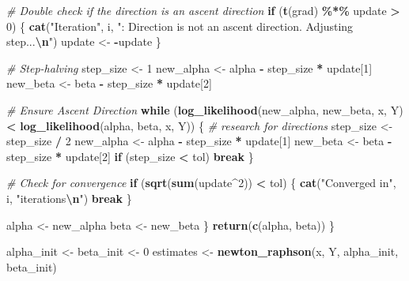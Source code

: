 \documentclass[
]{article}
\newenvironment{Shaded}{\begin{snugshade}}{\end{snugshade}}
\newcommand{\CommentTok}[1]{\textcolor[rgb]{0.56,0.35,0.01}{\textit{#1}}}
\newcommand{\ControlFlowTok}[1]{\textcolor[rgb]{0.13,0.29,0.53}{\textbf{#1}}}
\newcommand{\DecValTok}[1]{\textcolor[rgb]{0.00,0.00,0.81}{#1}}
\newcommand{\FunctionTok}[1]{\textcolor[rgb]{0.13,0.29,0.53}{\textbf{#1}}}
\newcommand{\NormalTok}[1]{#1}
\newcommand{\OtherTok}[1]{\textcolor[rgb]{0.56,0.35,0.01}{#1}}
\newcommand{\SpecialCharTok}[1]{\textcolor[rgb]{0.81,0.36,0.00}{\textbf{#1}}}
\newcommand{\StringTok}[1]{\textcolor[rgb]{0.31,0.60,0.02}{#1}}
\begin{document}
\begin{Shaded}
\begin{Highlighting}[]
     \CommentTok{\# Double check if the direction is an ascent direction}
    \ControlFlowTok{if}\NormalTok{ (}\FunctionTok{t}\NormalTok{(grad) }\SpecialCharTok{\%*\%}\NormalTok{ update }\SpecialCharTok{\textgreater{}} \DecValTok{0}\NormalTok{) \{}
      \FunctionTok{cat}\NormalTok{(}\StringTok{"Iteration"}\NormalTok{, i, }\StringTok{": Direction is not an ascent direction. Adjusting step...}\SpecialCharTok{\textbackslash{}n}\StringTok{"}\NormalTok{)}
\NormalTok{      update }\OtherTok{\textless{}{-}} \SpecialCharTok{{-}}\NormalTok{update}
\NormalTok{    \}}
    
    \CommentTok{\# Step{-}halving}
\NormalTok{    step\_size }\OtherTok{\textless{}{-}} \DecValTok{1}
\NormalTok{    new\_alpha }\OtherTok{\textless{}{-}}\NormalTok{ alpha }\SpecialCharTok{{-}}\NormalTok{ step\_size }\SpecialCharTok{*}\NormalTok{ update[}\DecValTok{1}\NormalTok{]}
\NormalTok{    new\_beta }\OtherTok{\textless{}{-}}\NormalTok{ beta }\SpecialCharTok{{-}}\NormalTok{ step\_size }\SpecialCharTok{*}\NormalTok{ update[}\DecValTok{2}\NormalTok{]}
    
    \CommentTok{\# Ensure Ascent Direction}
    \ControlFlowTok{while}\NormalTok{ (}\FunctionTok{log\_likelihood}\NormalTok{(new\_alpha, new\_beta, x, Y) }\SpecialCharTok{\textless{}} \FunctionTok{log\_likelihood}\NormalTok{(alpha, beta, x, Y)) \{ }
      \CommentTok{\# research for directions}
\NormalTok{      step\_size }\OtherTok{\textless{}{-}}\NormalTok{ step\_size }\SpecialCharTok{/} \DecValTok{2}
\NormalTok{      new\_alpha }\OtherTok{\textless{}{-}}\NormalTok{ alpha }\SpecialCharTok{{-}}\NormalTok{ step\_size }\SpecialCharTok{*}\NormalTok{ update[}\DecValTok{1}\NormalTok{]}
\NormalTok{      new\_beta }\OtherTok{\textless{}{-}}\NormalTok{ beta }\SpecialCharTok{{-}}\NormalTok{ step\_size }\SpecialCharTok{*}\NormalTok{ update[}\DecValTok{2}\NormalTok{]}
      \ControlFlowTok{if}\NormalTok{ (step\_size }\SpecialCharTok{\textless{}}\NormalTok{ tol) }\ControlFlowTok{break}
\NormalTok{    \}}
    
    \CommentTok{\# Check for convergence}
    \ControlFlowTok{if}\NormalTok{ (}\FunctionTok{sqrt}\NormalTok{(}\FunctionTok{sum}\NormalTok{(update}\SpecialCharTok{\^{}}\DecValTok{2}\NormalTok{)) }\SpecialCharTok{\textless{}}\NormalTok{ tol) \{}
      \FunctionTok{cat}\NormalTok{(}\StringTok{"Converged in"}\NormalTok{, i, }\StringTok{"iterations}\SpecialCharTok{\textbackslash{}n}\StringTok{"}\NormalTok{)}
      \ControlFlowTok{break}
\NormalTok{    \}}
    
\NormalTok{    alpha }\OtherTok{\textless{}{-}}\NormalTok{ new\_alpha}
\NormalTok{    beta }\OtherTok{\textless{}{-}}\NormalTok{ new\_beta}
\NormalTok{  \}}
  \FunctionTok{return}\NormalTok{(}\FunctionTok{c}\NormalTok{(alpha, beta))}
\NormalTok{\}}


\NormalTok{alpha\_init }\OtherTok{\textless{}{-}}\NormalTok{ beta\_init }\OtherTok{\textless{}{-}} \DecValTok{0}
\NormalTok{estimates }\OtherTok{\textless{}{-}} \FunctionTok{newton\_raphson}\NormalTok{(x, Y, alpha\_init, beta\_init)}
\end{Highlighting}
\end{Shaded}
\end{document}

